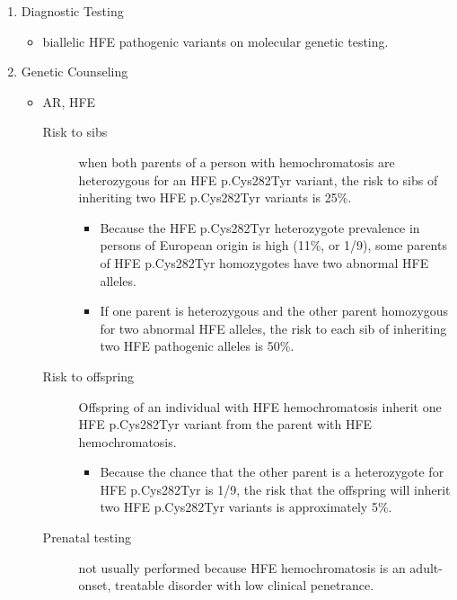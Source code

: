 \documentclass[12pt]{scrartcl}
\begin{document}
\begin{enumerate}
\item Diagnostic Testing
\label{sec:orgb07a818}
\begin{itemize}
\item biallelic HFE pathogenic variants on molecular genetic testing.
\end{itemize}
\item Genetic Counseling
\label{sec:org796ca43}
\begin{itemize}
\item AR, HFE
\begin{description}
\item[{Risk to sibs}] when both parents of a person with hemochromatosis
are heterozygous for an HFE p.Cys282Tyr variant,
the risk to sibs of inheriting two HFE p.Cys282Tyr
variants is 25\%.
\begin{itemize}
\item Because the HFE p.Cys282Tyr heterozygote prevalence in persons
of European origin is high (11\%, or 1/9), some parents of HFE
p.Cys282Tyr homozygotes have two abnormal HFE alleles.
\item If one parent is heterozygous and the other parent homozygous
for two abnormal HFE alleles, the risk to each sib of inheriting
two HFE pathogenic alleles is 50\%.
\end{itemize}
\item[{Risk to offspring}] Offspring of an individual with HFE
hemochromatosis inherit one HFE p.Cys282Tyr variant from the
parent with HFE hemochromatosis.
\begin{itemize}
\item Because the chance that the other parent is a heterozygote for
HFE p.Cys282Tyr is 1/9, the risk that the offspring will inherit
two HFE p.Cys282Tyr variants is approximately 5\%.
\end{itemize}
\item[{Prenatal testing}] not usually performed because HFE
hemochromatosis is an adult-onset, treatable disorder with low
clinical penetrance.
\end{description}
\end{itemize}
\end{enumerate}
\end{document}
